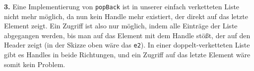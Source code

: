 \documentclass{article}
\begin{document}
\textbf{3.} Eine Implementierung von \texttt{popBack} ist
in unserer einfach verketteten Liste
nicht mehr möglich, da nun kein Handle mehr existiert, der direkt auf das letzte Element
zeigt. Ein Zugriff ist also nur möglich, indem alle Einträge der Liste abgegangen werden,
bis man auf das Element mit dem Handle stößt, der auf den Header zeigt (in der Skizze
oben wäre das \texttt{e2}). In einer doppelt-verketteten Liste gibt es Handles
in beide Richtungen, und ein Zugriff auf das letzte Element wäre somit kein Problem.
\end{document}
